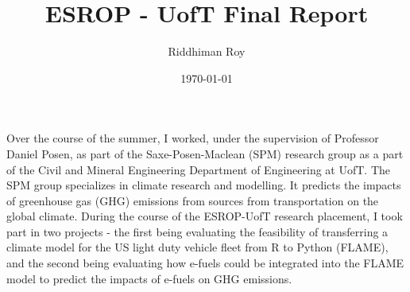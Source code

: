 \documentclass{article}
\title{
    \vspace{-2em}
    \textbf{ESROP - UofT Final Report}
    \large}
\author{Riddhiman Roy}
\date{\today}
\begin{document}
\maketitle
\doublespacing

Over the course of the summer, I worked, under the supervision of Professor Daniel Posen, as part of the Saxe-Posen-Maclean (SPM) research group as a part of the Civil and Mineral Engineering Department of Engineering at UofT. The SPM group specializes in climate research and modelling. It predicts the impacts of greenhouse gas (GHG) emissions from sources from transportation on the global climate. During the course of the ESROP-UofT research placement, I took part in two projects - the first being evaluating the feasibility of transferring a climate model for the US light duty vehicle fleet from R to Python (FLAME), and the second being evaluating how e-fuels could be integrated into the FLAME model to predict the impacts of e-fuels on GHG emissions.\\
\end{document}
